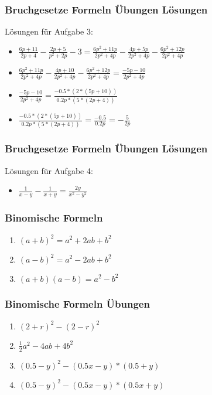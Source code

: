 \begin{frame}
    \frametitle{Bruchgesetze Formeln Übungen Lösungen}
	Lösungen für Aufgabe 3:
	\begin{itemize}
	\vfill \item $\frac{6p + 11}{2p + 4} - \frac{2p + 5}{p^2 +2p} -3 = \frac{6p^2 + 11p}{2p^2 + 4p} - \frac{4p + 5p}{2p^2 + 4p} - \frac{6p^2 + 12p}{2p^2 + 4p}$
	\vfill \item $\frac{6p^2 + 11p}{2p^2 + 4p} - \frac{4p + 10}{2p^2 + 4p} - \frac{6p^2 + 12p}{2p^2 + 4p} = \frac{-5p - 10}{2p^2 + 4p}$
	\vfill \item$ \frac{-5p - 10}{2p^2 + 4p} = \frac{-0.5 * (2 * (5p + 10))}{0.2p * (5 * (2p + 4))}$
	\vfill \item$\frac{-0.5 * (2 * (5p + 10))}{0.2p * (5 * (2p + 4))} = \frac{-0.5}{0.2p} = -\frac{5}{2p}$
	\end{itemize}
\end{frame}

\begin{frame}
    \frametitle{Bruchgesetze Formeln Übungen Lösungen}
	Lösungen für Aufgabe 4:
	\begin{itemize}
	\vfill \item$\frac{1}{x - y} - \frac{1}{x + y} = \frac{2y}{x^2-y^2}$
	\end{itemize}
\end{frame}

\begin{frame}
    \frametitle{Binomische Formeln}
    \begin{enumerate}
        \vfill \item $(a+b)^2 = a^2 + 2ab + b^2$
        \vfill \item $(a-b)^2 = a^2 - 2ab + b^2$
        \vfill \item $(a+b)(a-b) = a^2 - b^2$
    \end{enumerate}
\end{frame}

\begin{frame}
    \frametitle{Binomische Formeln Übungen}
    \begin{enumerate}
        \vfill \item $(2+r)^2 - (2-r)^2$
        \vfill \item $\frac{1}{2}a^2 - 4ab + 4b^2$
        \vfill \item $(0.5-y)^2 - (0.5x - y)*(0.5 + y)$
	\vfill \item $(0.5-y)^2 - (0.5x - y)*(0.5x + y)$
    \end{enumerate}
\end{frame}

